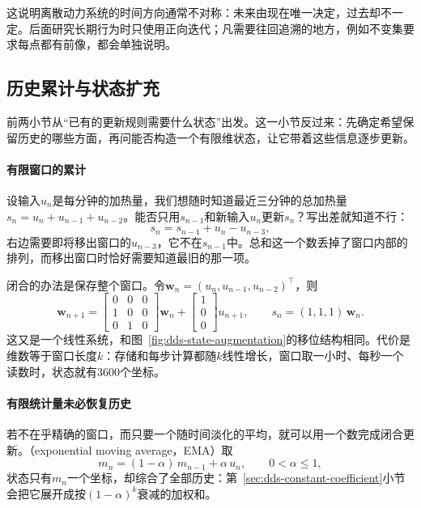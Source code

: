这说明离散动力系统的时间方向通常不对称：未来由现在唯一决定，过去却不一定。后面研究长期行为时只使用正向迭代；凡需要往回追溯的地方，例如不变集要求每点都有前像，都会单独说明。

\subsection{历史累计与状态扩充}
\label{sec:dds-history-augmentation}

前两小节从“已有的更新规则需要什么状态”出发。这一小节反过来：先确定希望保留历史的哪些方面，再问能否构造一个有限维状态，让它带着这些信息逐步更新。

\paragraph{有限窗口的累计}
设输入$u_n$是每分钟的加热量，我们想随时知道最近三分钟的总加热量$s_n=u_n+u_{n-1}+u_{n-2}$。能否只用$s_{n-1}$和新输入$u_n$更新$s_n$？写出差就知道不行：
\[
  s_n=s_{n-1}+u_n-u_{n-3},
\]
右边需要即将移出窗口的$u_{n-3}$，它不在$s_{n-1}$中。总和这一个数丢掉了窗口内部的排列，而移出窗口时恰好需要知道最旧的那一项。

闭合的办法是保存整个窗口。令$\bm w_n=(u_n,u_{n-1},u_{n-2})^{\top}$，则
\[
  \bm w_{n+1}=\begin{bmatrix}0&0&0\\1&0&0\\0&1&0\end{bmatrix}\bm w_n+\begin{bmatrix}1\\0\\0\end{bmatrix}u_{n+1},
  \qquad s_n=(1,1,1)\,\bm w_n.
\]
这又是一个线性系统，和图~\ref{fig:dds-state-augmentation}的移位结构相同。代价是维数等于窗口长度$k$：存储和每步计算都随$k$线性增长，窗口取一小时、每秒一个读数时，状态就有$3600$个坐标。

\paragraph{有限统计量未必恢复历史}
若不在乎精确的窗口，而只要一个随时间淡化的平均，就可以用一个数完成闭合更新。（exponential moving average，EMA）取
\begin{equation}
  m_n=(1-\alpha)\,m_{n-1}+\alpha\,u_n,\qquad 0<\alpha\leq1,
  \label{eq:dds-ema}
\end{equation}
状态只有$m_n$一个坐标，却综合了全部历史：第~\ref{sec:dds-constant-coefficient}小节会把它展开成按$(1-\alpha)^k$衰减的加权和。

